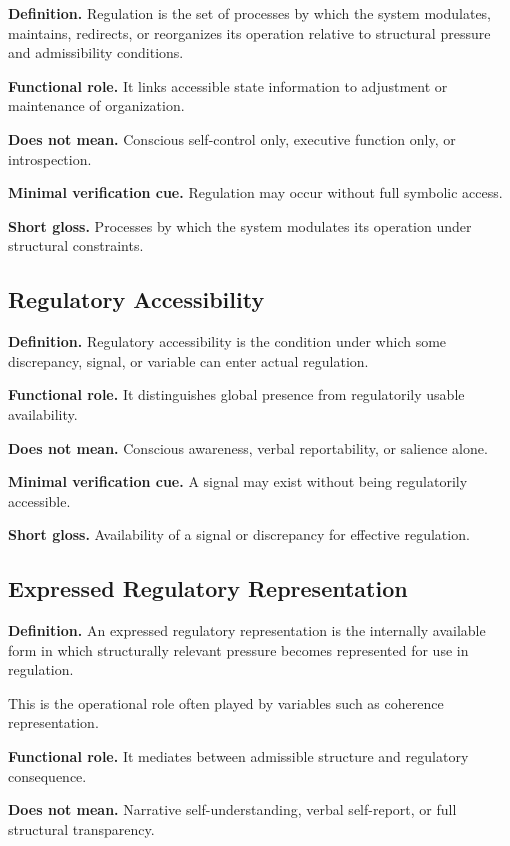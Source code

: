 \documentclass[11pt,a4paper]{article}
\begin{document}
	\textbf{Definition.} Regulation is the set of processes by which the system modulates, maintains, redirects, or reorganizes its operation relative to structural pressure and admissibility conditions.
	
	\textbf{Functional role.} It links accessible state information to adjustment or maintenance of organization.
	
	\textbf{Does not mean.} Conscious self-control only, executive function only, or introspection.
	
	\textbf{Minimal verification cue.} Regulation may occur without full symbolic access.
	
	\textbf{Short gloss.} Processes by which the system modulates its operation under structural constraints.
	
	\subsection{Regulatory Accessibility}
	
	\textbf{Definition.} Regulatory accessibility is the condition under which some discrepancy, signal, or variable can enter actual regulation.
	
	\textbf{Functional role.} It distinguishes global presence from regulatorily usable availability.
	
	\textbf{Does not mean.} Conscious awareness, verbal reportability, or salience alone.
	
	\textbf{Minimal verification cue.} A signal may exist without being regulatorily accessible.
	
	\textbf{Short gloss.} Availability of a signal or discrepancy for effective regulation.
	
	\subsection{Expressed Regulatory Representation}
	
	\textbf{Definition.} An expressed regulatory representation is the internally available form in which structurally relevant pressure becomes represented for use in regulation.
	
	This is the operational role often played by variables such as coherence representation.
	
	\textbf{Functional role.} It mediates between admissible structure and regulatory consequence.
	
	\textbf{Does not mean.} Narrative self-understanding, verbal self-report, or full structural transparency.
	
\end{document}
